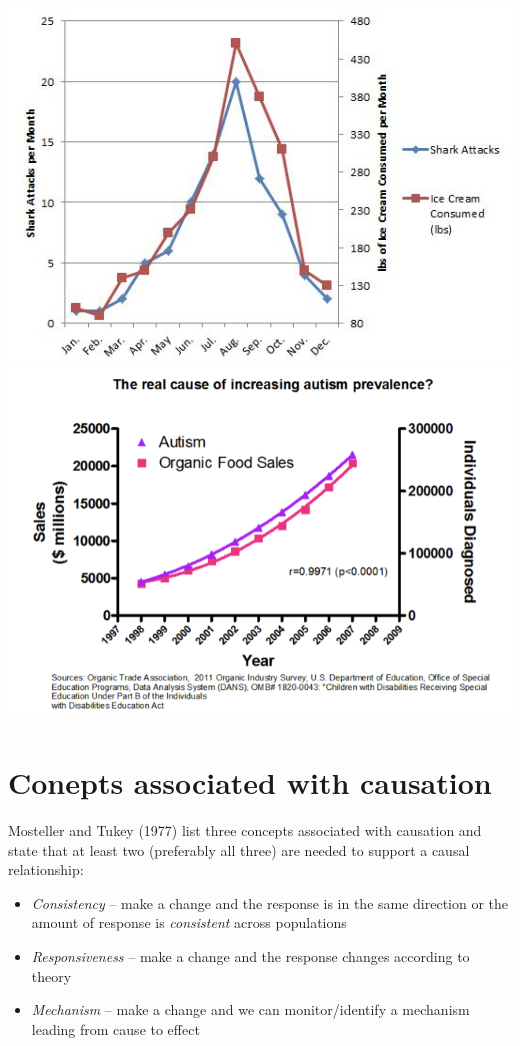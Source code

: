 \documentclass[
]{book}
\providecommand{\tightlist}{%
  \setlength{\itemsep}{0pt}\setlength{\parskip}{0pt}}
\begin{document}
\includegraphics[width=7.44in]{images/IceCream_Shark}
\includegraphics[width=8.89in]{images/Autism_Organic}

\hypertarget{conepts-associated-with-causation}{%
\section{Conepts associated with causation}\label{conepts-associated-with-causation}}

Mosteller and Tukey (1977) list three concepts associated with causation and state that at least two (preferably all three) are needed to support a causal relationship:

\begin{itemize}
\tightlist
\item
  \emph{Consistency} -- make a change and the response is in the same direction or the amount of response is \emph{consistent} across populations
\item
  \emph{Responsiveness} -- make a change and the response changes according to theory
\item
  \emph{Mechanism} -- make a change and we can monitor/identify a mechanism leading from cause to effect
\end{itemize}
\end{document}
